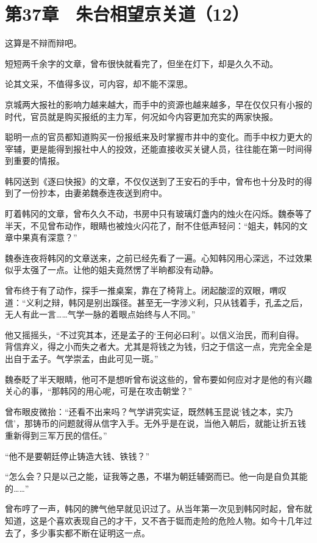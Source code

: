 \section{第37章　朱台相望京关道（12）}

这算是不辩而辩吧。

短短两千余字的文章，曾布很快就看完了，但坐在灯下，却是久久不动。

论其文采，不值得多议，可内容，却不能不深思。

京城两大报社的影响力越来越大，而手中的资源也越来越多，早在仅仅只有小报的时代，官员就是购买报纸的主力军，何况如今内容更加充实的两家快报。

聪明一点的官员都知道购买一份报纸来及时掌握市井中的变化。而手中权力更大的宰辅，更是能得到报社中人的投效，还能直接收买关键人员，往往能在第一时间得到重要的情报。

韩冈送到《逐曰快报》的文章，不仅仅送到了王安石的手中，曾布也十分及时的得到了一份抄本，由妻弟魏泰连夜送到府中。

盯着韩冈的文章，曾布久久不动，书房中只有玻璃灯盏内的烛火在闪烁。魏泰等了半天，不见曾布动作，眼睛也被烛火闪花了，耐不住低声轻问：“姐夫，韩冈的文章中果真有深意？”

魏泰连夜将韩冈的文章送来，之前已经先看了一遍。心知韩冈用心深远，不过效果似乎太强了一点。让他的姐夫竟然愣了半晌都没有动静。

曾布终于有了动作，探手一推桌案，靠在了椅背上。闭起酸涩的双眼，喟叹道：“义利之辩，韩冈是别出蹊径。甚至无一字涉义利，只从钱着手，孔孟之后，无人有此一言……气学一脉的着眼点始终与人不同。”

他又摇摇头，“不过究其本，还是孟子的‘王何必曰利’。以信义治民，而利自得。背信弃义，得之小而失之者大。尤其是将钱之为钱，归之于信这一点，完完全全是出自于孟子。气学崇孟，由此可见一斑。”

魏泰眨了半天眼睛，他可不是想听曾布说这些的，曾布要如何应对才是他的有兴趣关心的事，“那韩冈的用心呢，可是在攻击朝堂？”

曾布眼皮微抬：“还看不出来吗？气学讲究实证，既然韩玉昆说‘钱之本，实乃信’，那铸币的问题就得从信字入手。无外乎是在说，当他入朝后，就能让折五钱重新得到三军万民的信任。”

“他不是要朝廷停止铸造大钱、铁钱？”

“怎么会？只是以己之能，证我等之愚，不堪为朝廷辅弼而已。他一向是自负其能的……”

曾布哼了一声，韩冈的脾气他早就见识过了。从当年第一次见到韩冈时起，曾布就知道，这是个喜欢表现自己的才干，又不吝于铤而走险的危险人物。如今十几年过去了，多少事实都不断在证明这一点。

